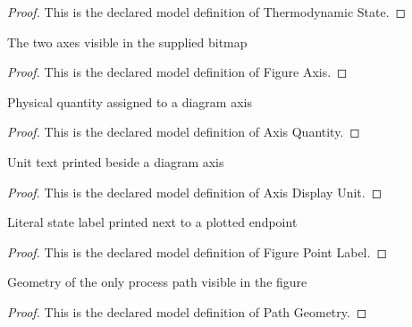 \begin{proof}
  This is the declared model definition of Thermodynamic State.
\end{proof}
\begin{definition}
  \label{def:physics:phyx-mini-0413:phyxminiproblems-problemphyxmini0413-figureaxis}
  The two axes visible in the supplied bitmap
\end{definition}
\begin{proof}
  This is the declared model definition of Figure Axis.
\end{proof}
\begin{definition}
  \label{def:physics:phyx-mini-0413:phyxminiproblems-problemphyxmini0413-axisquantity}
  Physical quantity assigned to a diagram axis
\end{definition}
\begin{proof}
  This is the declared model definition of Axis Quantity.
\end{proof}
\begin{definition}
  \label{def:physics:phyx-mini-0413:phyxminiproblems-problemphyxmini0413-axisdisplayunit}
  Unit text printed beside a diagram axis
\end{definition}
\begin{proof}
  This is the declared model definition of Axis Display Unit.
\end{proof}
\begin{definition}
  \label{def:physics:phyx-mini-0413:phyxminiproblems-problemphyxmini0413-figurepointlabel}
  Literal state label printed next to a plotted endpoint
\end{definition}
\begin{proof}
  This is the declared model definition of Figure Point Label.
\end{proof}
\begin{definition}
  \label{def:physics:phyx-mini-0413:phyxminiproblems-problemphyxmini0413-pathgeometry}
  Geometry of the only process path visible in the figure
\end{definition}
\begin{proof}
  This is the declared model definition of Path Geometry.
\end{proof}
